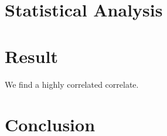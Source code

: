 \documentclass[]{IEEEtran}
\begin{document}
\section{Statistical Analysis}

\section{Result}

We find a highly correlated correlate.

\section{Conclusion}



\end{document}
